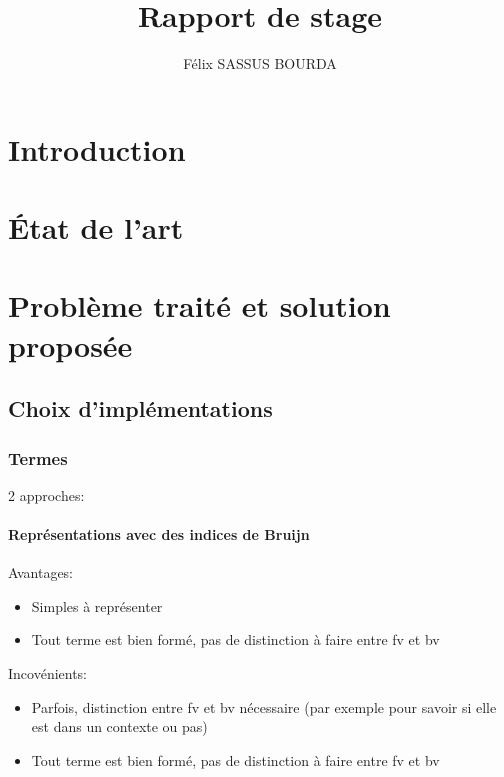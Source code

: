\documentclass[12pt]{article}
\author{Félix SASSUS BOURDA}
\title{
    Rapport de stage
}
\begin{document}
\large
\maketitle
\newpage

\section{Introduction}


\newpage

\section{État de l'art}







\newpage

\section{Problème traité et solution proposée}
\subsection{Choix d'implémentations}

\subsubsection{Termes}

2 approches:
\paragraph{Représentations avec des indices de Bruijn}
Avantages:
\begin{itemize}
  \item Simples à représenter
  \item Tout terme est bien formé, pas de distinction à faire entre fv et bv
\end{itemize}

Incovénients:
\begin{itemize}
  \item Parfois, distinction entre fv et bv nécessaire (par exemple pour savoir si elle est dans un contexte ou pas)
  \item Tout terme est bien formé, pas de distinction à faire entre fv et bv
\end{itemize}
\end{document}
